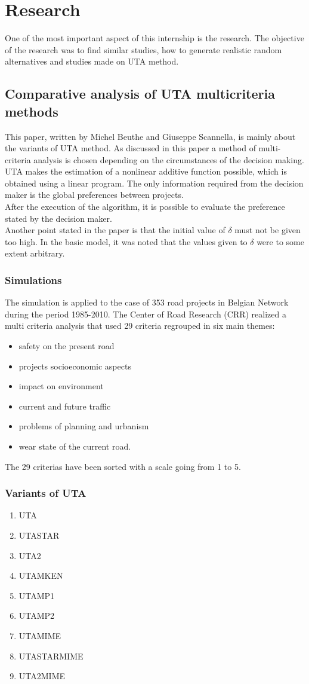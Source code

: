 \documentclass{report}
\begin{document}
\section{Research}
One of the most important aspect of this internship is the research. The objective of the research was to find similar studies, how to generate realistic random alternatives and studies made on UTA method.
\subsection{Comparative analysis of UTA multicriteria methods}
This paper, written by Michel Beuthe and Giuseppe Scannella, is mainly about the variants of UTA method. As discussed in this paper a method of multi-criteria analysis is chosen depending on the circumstances of the decision making. UTA makes the estimation of a nonlinear additive function possible, which is obtained using a linear program. The only information required from the decision maker is the global preferences between projects. \\
After the execution of the algorithm, it is possible to evaluate the preference stated by the decision maker.\\
Another point stated in the paper is that the initial value of $\delta$ must not be given too high. In the basic model, it was noted that the values given to $\delta$ were to some extent arbitrary. 
\subsubsection{Simulations}
The simulation is applied to the case of 353 road projects in Belgian Network during the period 1985-2010. The Center of Road Research (CRR) realized a multi criteria analysis that used 29 criteria regrouped in six main themes: 
\begin{itemize}
\item safety on the present road
\item projects socioeconomic aspects
\item impact on environment
\item current and future traffic
\item problems of planning and urbanism
\item wear state of the current road.
\end{itemize}
The 29 criterias have been sorted with a scale going from 1 to 5. 

\subsubsection{Variants of UTA}
\begin{enumerate}
\item UTA
\item UTASTAR
\item UTA2
\item UTAMKEN
\item UTAMP1
\item UTAMP2
\item UTAMIME
\item UTASTARMIME
\item UTA2MIME
\end{enumerate}
\end{document}
